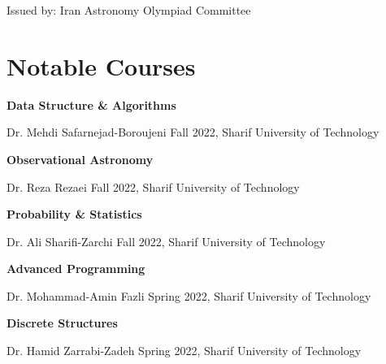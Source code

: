 \documentclass{article}
\begin{document}
\hspace{22mm}
Issued by: Iran Astronomy Olympiad Committee


\section*{\textcolor{BrickRed}{Not}able Courses  \noindent\hrulefill}

\hspace{5mm}
\textbf{Data Structure \& Algorithms}

\hspace{10mm}
Dr. Mehdi Safarnejad-Boroujeni \hfill Fall 2022, Sharif University of Technology

\vspace{5mm}

\hspace{5mm}
\textbf{Observational Astronomy}

\hspace{10mm}
Dr. Reza Rezaei \hfill Fall 2022, Sharif University of Technology

\vspace{5mm}

\hspace{5mm}
\textbf{Probability \& Statistics }

\hspace{10mm}
Dr. Ali Sharifi-Zarchi \hfill Fall 2022, Sharif University of Technology


\vspace{5mm}

\hspace{5mm}
\textbf{Advanced Programming}

\hspace{10mm}
Dr. Mohammad-Amin Fazli \hfill Spring 2022, Sharif University of Technology

\vspace{5mm}

\hspace{5mm}
\textbf{Discrete Structures }

\hspace{10mm}
Dr. Hamid Zarrabi-Zadeh \hfill Spring 2022, Sharif University of Technology


 
\end{document}
